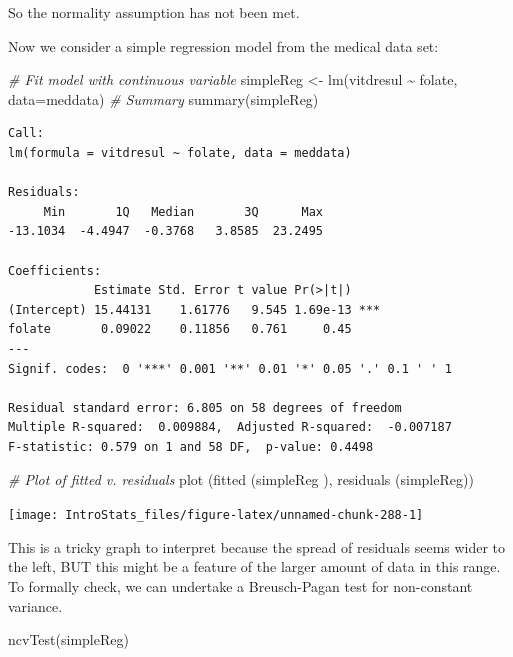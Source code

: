 \documentclass[
  oneside]{krantz}
\newenvironment{Shaded}{\begin{snugshade}}{\end{snugshade}}
\newcommand{\AttributeTok}[1]{\textcolor[rgb]{0.77,0.63,0.00}{#1}}
\newcommand{\CommentTok}[1]{\textcolor[rgb]{0.56,0.35,0.01}{\textit{#1}}}
\newcommand{\FunctionTok}[1]{\textcolor[rgb]{0.00,0.00,0.00}{#1}}
\newcommand{\NormalTok}[1]{#1}
\newcommand{\OtherTok}[1]{\textcolor[rgb]{0.56,0.35,0.01}{#1}}
\newcommand{\SpecialCharTok}[1]{\textcolor[rgb]{0.00,0.00,0.00}{#1}}
\begin{document}
So the normality assumption has not been met.

Now we consider a simple regression model from the medical data set:

\begin{Shaded}
\begin{Highlighting}[]
\CommentTok{\# Fit model with continuous variable}
\NormalTok{simpleReg }\OtherTok{\textless{}{-}} \FunctionTok{lm}\NormalTok{(vitdresul }\SpecialCharTok{\textasciitilde{}}\NormalTok{ folate, }\AttributeTok{data=}\NormalTok{meddata)}
\CommentTok{\# Summary}
\FunctionTok{summary}\NormalTok{(simpleReg)}
\end{Highlighting}
\end{Shaded}

\begin{verbatim}
Call:
lm(formula = vitdresul ~ folate, data = meddata)

Residuals:
     Min       1Q   Median       3Q      Max 
-13.1034  -4.4947  -0.3768   3.8585  23.2495 

Coefficients:
            Estimate Std. Error t value Pr(>|t|)    
(Intercept) 15.44131    1.61776   9.545 1.69e-13 ***
folate       0.09022    0.11856   0.761     0.45    
---
Signif. codes:  0 '***' 0.001 '**' 0.01 '*' 0.05 '.' 0.1 ' ' 1

Residual standard error: 6.805 on 58 degrees of freedom
Multiple R-squared:  0.009884,  Adjusted R-squared:  -0.007187 
F-statistic: 0.579 on 1 and 58 DF,  p-value: 0.4498
\end{verbatim}

\begin{Shaded}
\begin{Highlighting}[]
\CommentTok{\# Plot of fitted v. residuals }
\FunctionTok{plot}\NormalTok{ (}\FunctionTok{fitted}\NormalTok{ (simpleReg ), }\FunctionTok{residuals}\NormalTok{ (simpleReg))}
\end{Highlighting}
\end{Shaded}

\begin{center}\texttt{[image: IntroStats\_files/figure-latex/unnamed-chunk-288-1]} \end{center}

This is a tricky graph to interpret because the spread of residuals seems wider to the left, BUT this might be a feature of the larger amount of data in this range. To formally check, we can undertake a Breusch-Pagan test for non-constant variance.

\begin{Shaded}
\begin{Highlighting}[]
\FunctionTok{ncvTest}\NormalTok{(simpleReg)}
\end{Highlighting}
\end{Shaded}
\end{document}
